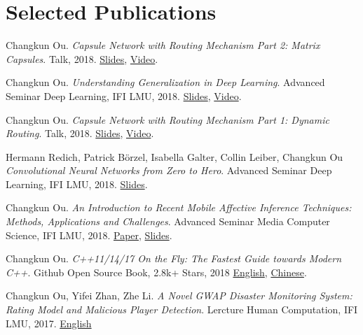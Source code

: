 \section{\textbf{Selected Publications}}
 \resumeSubHeadingListStart
    \item{
      Changkun Ou.
      \emph{Capsule Network with Routing Mechanism Part 2: Matrix Capsules}. Talk, 2018. \href{https://docs.google.com/presentation/d/1ccEsDtqjyQVvEvF-MDfwwnXqht5mPRE3c800vs5yJNY/edit?usp=sharing}{Slides}, \href{https://www.youtube.com/watch?v=akq6PNnkKY8}{Video}.
    }
    \item{
      Changkun Ou.
      \emph{Understanding Generalization in Deep Learning}.
      Advanced Seminar Deep Learning, IFI LMU, 2018. \href{https://docs.google.com/presentation/d/1eNUYH9_3bbBO7bONPU8BCTr2DOMC69gdOJvBgpLjwNg/edit?usp=sharing}{Slides}, \href{https://www.youtube.com/watch?v=z9je5YlnBgI&t=1585s}{Video}.
    }
    \item{
      Changkun Ou.
      \emph{Capsule Network with Routing Mechanism Part 1: Dynamic Routing}. Talk, 2018. \href{https://docs.google.com/presentation/d/1w5Ah406ufGu1M1iwly0e-QYFl3MMdHRK29LLibRB9HU/edit?usp=sharing}{Slides}, \href{https://www.youtube.com/watch?v=wC0rhjvst8I}{Video}.
    }
    \item{
      Hermann Redich, Patrick Börzel, Isabella Galter, Collin Leiber, Changkun Ou
      \emph{Convolutional Neural Networks from Zero to Hero}.
      Advanced Seminar Deep Learning, IFI LMU, 2018. \href{https://github.com/changkun/talks/blob/master/201712/cnn.pdf}{Slides}.
    }
    \item{
      Changkun Ou.
      \emph{An Introduction to Recent Mobile Affective Inference Techniques: Methods, Applications and Challenges}.
      Advanced Seminar Media Computer Science, IFI LMU, 2018. \href{https://github.com/changkun/hs-ws17-mobile-emotion-inference/blob/master/src/lmumihs-ou.pdf}{Paper}, \href{https://github.com/changkun/hs-ws17-mobile-emotion-inference/blob/master/slides/presentation-final.pdf}{Slides}.
    }
    \item{
      Changkun Ou.
      \emph{C++11/14/17 On the Fly: The Fastest Guide towards Modern C++}.
      Github Open Source Book, 2.8k+ Stars, 2018 \href{https://github.com/changkun/modern-cpp-tutorial}{English}, \href{https://github.com/changkun/modern-cpp-tutorial}{Chinese}.
    }
    \item{
      Changkun Ou, Yifei Zhan, Zhe Li.
      \emph{A Novel GWAP Disaster Monitoring System: Rating Model and Malicious Player Detection}.
      Lercture Human Computation, IFI LMU, 2017.
      \href{https://github.com/changkun/hc-ss17-disaster-monitoring/blob/master/report/hc_final_project_report_team_Hotpot.pdf}{English}
    }

